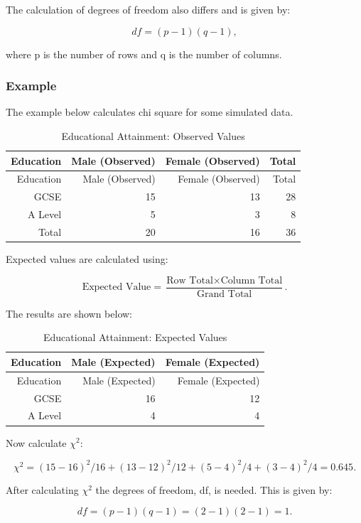 \documentclass[
]{book}
\begin{document}
The calculation of degrees of freedom also differs and is given by:

\[df=(p-1)(q-1),\]

where p is the number of rows and q is the number of columns.

\hypertarget{example-15}{%
\subsubsection{Example}\label{example-15}}

The example below calculates chi square for some simulated data.

\begin{longtable}[]{@{}rrrr@{}}
\caption{\label{tab:table12} Educational Attainment: Observed Values}\tabularnewline
\toprule
Education & Male (Observed) & Female (Observed) & Total \\
\midrule
\endfirsthead
\toprule
Education & Male (Observed) & Female (Observed) & Total \\
\midrule
\endhead
GCSE & 15 & 13 & 28 \\
A Level & 5 & 3 & 8 \\
Total & 20 & 16 & 36 \\
\bottomrule
\end{longtable}

Expected values are calculated using:

\[\textrm{Expected Value}= \frac{\textrm{Row Total} \times \textrm{Column Total}}{\textrm{Grand Total}}.\]

The results are shown below:

\begin{longtable}[]{@{}rrr@{}}
\caption{\label{tab:table13} Educational Attainment: Expected Values}\tabularnewline
\toprule
Education & Male (Expected) & Female (Expected) \\
\midrule
\endfirsthead
\toprule
Education & Male (Expected) & Female (Expected) \\
\midrule
\endhead
GCSE & 16 & 12 \\
A Level & 4 & 4 \\
\bottomrule
\end{longtable}

Now calculate \(\chi^2\):

\[\chi^2=(15-16)^2/16 +(13-12)^2/12+(5-4)^2/4 + (3-4)^2/4 = 0.645.\]

After calculating \(\chi^2\) the degrees of freedom, df, is needed. This is given by:

\[df=(p-1)(q-1)=(2-1)(2-1)=1.\]
\end{document}
